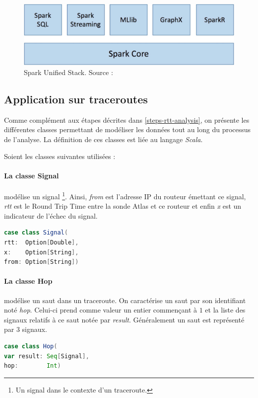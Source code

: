 \begin{figure}[H]
	\centering
	\includegraphics[width=0.7\linewidth]{illustrations/unified-stack}
	\caption{ Spark Unified Stack. Source : \cite{eginning-Apache-Spark-2-unified-stack}}
	\label{fig:unified-stack}
\end{figure}





\subsection{Application sur traceroutes}
Comme complément aux étapes décrites dans \ref{steps-rtt-analysis}, on présente les différentes classes permettant de modéliser les données tout au long du processus de l'analyse. La définition de ces classes est liée au langage \textit{Scala}. 

Soient les classes suivantes utilisées : 

\paragraph{La classe Signal} modélise un signal \footnote{Un signal dans le contexte d'un traceroute.}. Ainsi, \textit{from} est l'adresse IP du routeur émettant ce signal, \textit{rtt} est le Round Trip Time entre la sonde Atlas et ce routeur et enfin \textit{x} est un indicateur de l'échec du signal.
\begin{lstlisting}[language=scala]
case class Signal(
rtt:  Option[Double],
x:    Option[String],
from: Option[String])
\end{lstlisting}

\paragraph{La classe Hop} modélise un saut dans un traceroute. On caractérise un saut par son identifiant noté \textit{hop}. Celui-ci   prend comme valeur un entier commençant à $1$ et la liste des signaux relatifs à ce saut notée par \textit{result}. Généralement un saut est représenté par $3$ signaux.
\begin{lstlisting}[language=scala]
case class Hop(
var result: Seq[Signal],
hop:        Int)
\end{lstlisting}
